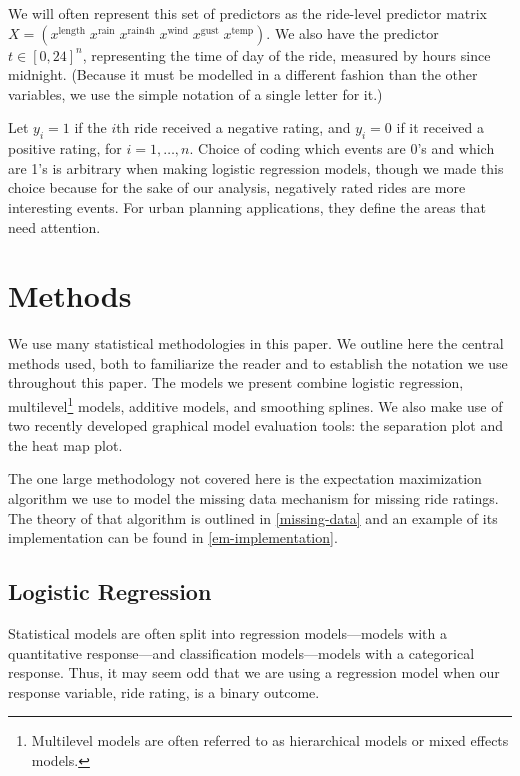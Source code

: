 \documentclass[12pt,twoside]{reedthesis}
\begin{document}
  We will often represent this set of predictors as the ride-level
  predictor matrix
  \(X = (x^\text{length} \; x^\text{rain} \; x^\text{rain4h} \; x^\text{wind} \; x^\text{gust}\; x^\text{temp}).\)
  We also have the predictor \(t \in [0, 24]^n\), representing the time of
  day of the ride, measured by hours since midnight. (Because it must be
  modelled in a different fashion than the other variables, we use the
  simple notation of a single letter for it.)
  
  Let \(y_i = 1\) if the \(i\)th ride received a negative rating, and
  \(y_i = 0\) if it received a positive rating, for \(i = 1, \ldots, n\).
  Choice of coding which events are 0's and which are 1's is arbitrary
  when making logistic regression models, though we made this choice
  because for the sake of our analysis, negatively rated rides are more
  interesting events. For urban planning applications, they define the
  areas that need attention.
  
  \chapter{Methods}\label{methods}
  
  We use many statistical methodologies in this paper. We outline here the
  central methods used, both to familiarize the reader and to establish
  the notation we use throughout this paper. The models we present combine
  logistic regression, multilevel\footnote{Multilevel models are often
    referred to as hierarchical models or mixed effects models.} models,
  additive models, and smoothing splines. We also make use of two recently
  developed graphical model evaluation tools: the separation plot and the
  heat map plot.
  
  The one large methodology not covered here is the expectation
  maximization algorithm we use to model the missing data mechanism for
  missing ride ratings. The theory of that algorithm is outlined in
  \autoref{missing-data} and an example of its implementation can be found
  in \autoref{em-implementation}.
  
  \section{Logistic Regression}\label{logistic-regression}
  
  Statistical models are often split into regression models---models with
  a quantitative response---and classification models---models with a
  categorical response. Thus, it may seem odd that we are using a
  regression model when our response variable, ride rating, is a binary
  outcome.
  
\end{document}
